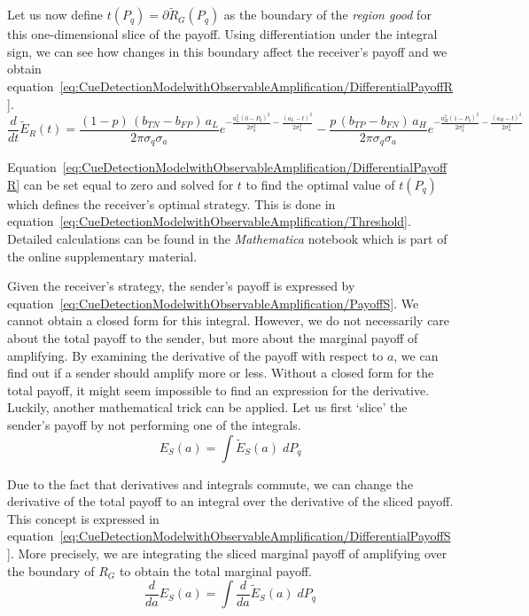\documentclass[a4paper,12pt]{article}
\numberwithin{equation}{section}
\numberwithin{figure}{section}
\begin{document}
Let us now define $t(P_{q})=\partial \tilde{R}_{G}(P_{q})$ as the boundary of the \textit{region good} for this \mbox{one-dimensional} slice of the payoff. Using differentiation under the integral sign, we can see how changes in this boundary affect the receiver's payoff and we obtain equation~\ref{eq:CueDetectionModelwithObservableAmplification/DifferentialPayoffR}.
\begin{equation}
\label{eq:CueDetectionModelwithObservableAmplification/DifferentialPayoffR}
\frac{d}{dt}\tilde{E}_{R}(t)= \frac{(1-p) \, (b_{TN}-b_{FP}) \, a_{L}}{2 \pi \sigma_{q} \sigma_{a}} e^{-\frac{a_{L}^{2} (0-P_{q})^2}{2 \sigma_{q}^2}-\frac{(a_{L}-t)^2}{2 \sigma_{a}^2}} - \frac{p \, (b_{TP}-b_{FN}) \, a_{H}}{2 \pi \sigma_{q} \sigma_{a}} e^{-\frac{a_{H}^{2} (1-P_{q})^2}{2 \sigma_{q}^2}-\frac{(a_{H}-t)^2}{2 \sigma_{a}^2}}
\end{equation}

Equation~\ref{eq:CueDetectionModelwithObservableAmplification/DifferentialPayoffR} can be set equal to zero and solved for $t$ to find the optimal value of $t(P_{q})$ which defines the receiver's optimal strategy. This is done in equation~\ref{eq:CueDetectionModelwithObservableAmplification/Threshold}. Detailed calculations can be found in the \textit{Mathematica} notebook which is part of the online supplementary material.

Given the receiver's strategy, the sender's payoff is expressed by equation~\ref{eq:CueDetectionModelwithObservableAmplification/PayoffS}. We cannot obtain a closed form for this integral. However, we do not necessarily care about the total payoff to the sender, but more about the marginal payoff of amplifying. By examining the derivative of the payoff with respect to $a$, we can find out if a sender should amplify more or less. Without a closed form for the total payoff, it might seem impossible to find an expression for the derivative. Luckily, another mathematical trick can be applied. Let us first `slice' the sender's payoff by not performing one of the integrals.
\begin{equation}
\label{eq:CueDetectionModelwithObservableAmplification/SlicedPayoffS}
E_{S}(a) = \displaystyle \int \tilde{E}_{S}(a) \; dP_{q}
\end{equation}

Due to the fact that derivatives and integrals commute, we can change the derivative of the total payoff to an integral over the derivative of the sliced payoff. This concept is expressed in equation~\ref{eq:CueDetectionModelwithObservableAmplification/DifferentialPayoffS}. More precisely, we are integrating the sliced marginal payoff of amplifying over the boundary of $R_G$ to obtain the total marginal payoff.
\begin{equation}
\label{eq:CueDetectionModelwithObservableAmplification/DifferentialPayoffS}
\frac{d}{da} E_{S}(a) = \displaystyle \int \frac{d}{da} \tilde{E}_{S}(a) \; dP_{q}
\end{equation}
\end{document}
